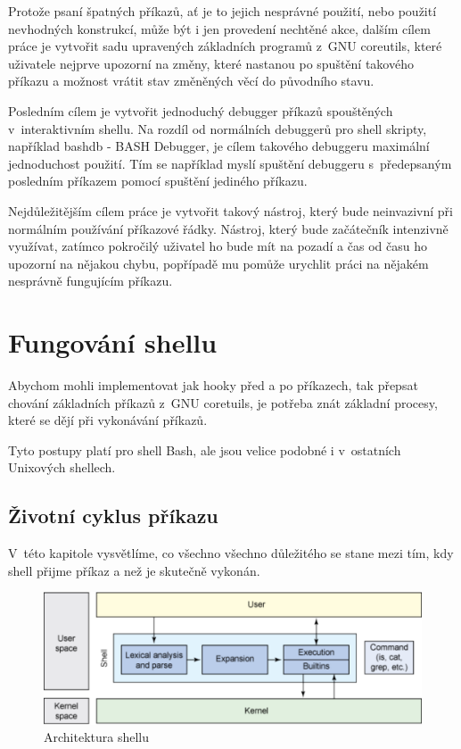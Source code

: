\documentclass[thesis=M,czech]{FITthesis}[2012/06/26]
\begin{document}
Protože psaní špatných příkazů, ať je to jejich nesprávné použití, nebo použití nevhodných konstrukcí, může být i jen provedení nechtěné akce, dalším cílem práce je vytvořit sadu upravených základních programů z~GNU coreutils, které uživatele nejprve upozorní na změny, které nastanou po spuštění takového příkazu a možnost vrátit stav změněných věcí do původního stavu.

Posledním cílem je vytvořit jednoduchý debugger příkazů spouštěných v~interaktivním shellu. Na rozdíl od normálních debuggerů pro shell skripty, například bashdb - BASH Debugger, je cílem takového debuggeru maximální jednoduchost použití. Tím se například myslí spuštění debuggeru s~předepsaným posledním příkazem pomocí spuštění jediného příkazu.

Nejdůležitějším cílem práce je vytvořit takový nástroj, který bude neinvazivní při normálním používání příkazové řádky. Nástroj, který bude začátečník intenzivně využívat, zatímco pokročilý uživatel ho bude mít na pozadí a čas od času ho upozorní na nějakou chybu, popřípadě mu pomůže urychlit práci na nějakém nesprávně fungujícím příkazu.

%
%
%
\section{Fungování shellu}

Abychom mohli implementovat jak hooky před a po příkazech, tak přepsat chování základních příkazů z~GNU coretuils, je potřeba znát základní procesy, které se dějí při vykonávání příkazů.

Tyto postupy platí pro shell Bash, ale jsou velice podobné i v~ostatních Unixových shellech.

%
%
%
\subsection{Životní cyklus příkazu}

V~této kapitole vysvětlíme, co všechno všechno důležitého se stane mezi tím, kdy shell přijme příkaz a než je skutečně vykonán.

\begin{figure}[htb]\centering
	\includegraphics[width=\textwidth]{./images/shell_arch2}
	\caption{Architektura shellu}
	\label{fig:shell_arch}
\end{figure}
\end{document}
